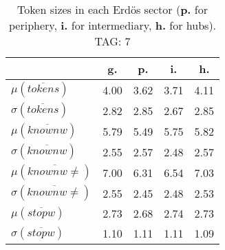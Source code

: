\begin{table}[h!]
\begin{center}
\begin{tabular}{| l | c | c | c | c |}\hline
 & g. & p. & i. & h. \\\hline
$\mu(\overline{tokens})$ & 4.00  & 3.62  & 3.71  & 4.11 \\\hline
$\sigma(\overline{tokens})$ & 2.82  & 2.85  & 2.67  & 2.85 \\\hline
$\mu(\overline{knownw})$ & 5.79  & 5.49  & 5.75  & 5.82 \\\hline
$\sigma(\overline{knownw})$ & 2.55  & 2.57  & 2.48  & 2.57 \\\hline
$\mu(\overline{knownw \neq})$ & 7.00  & 6.31  & 6.54  & 7.03 \\\hline
$\sigma(\overline{knownw \neq})$ & 2.55  & 2.45  & 2.48  & 2.53 \\\hline
$\mu(\overline{stopw})$ & 2.73  & 2.68  & 2.74  & 2.73 \\\hline
$\sigma(\overline{stopw})$ & 1.10  & 1.11  & 1.11  & 1.09 \\\hline
\end{tabular}
\caption{Token sizes in each Erd\"os sector ({{\bf p.}} for periphery, {{\bf i.}} for intermediary, {{\bf h.}} for hubs). TAG: 7}
\end{center}
\end{table}